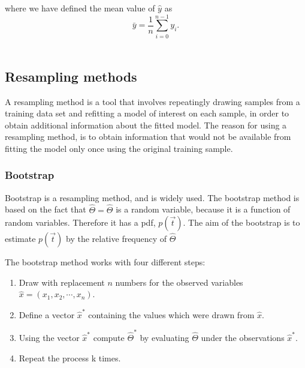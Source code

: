 where we have defined the mean value  of $\hat{y}$ as
\begin{equation}
\bar{y} =  \frac{1}{n} \sum_{i=0}^{n - 1} y_i.
\end{equation}~\cite{Project1}

\subsection{Resampling methods}
A resampling method is a tool that involves 
repeatingly drawing samples from a training data set and refitting a model
of interest on each sample, in order to obtain additional information 
about the fitted model. 
The reason for using a resampling method, is to obtain information that would
not be available from fitting the model only once using the original training
sample. ~\cite{LectureNotes-FysStk}

\subsubsection{Bootstrap}\label{sec:bootstrap}
Bootstrap is a resampling method, and is widely used.
The bootstrap method is based on the fact that \(\hat{\Theta} = \hat{\Theta}\)
is a random variable, because it is a function of random variables. 
Therefore it has a pdf, \(p(\vec{t})\). The aim of the bootstrap is to 
estimate \(p(\vec{t})\) by the relative frequency of \(\hat{\Theta}\)
~\cite{LectureNotes-FysStk}

The bootstrap method works with four different steps: 
\begin{enumerate}
		\item Draw with replacement \(n\) numbers for the observed variables
			\(\hat{x} = (x_1, x_2,\cdots, x_n)\).
		\item Define a vector \(\hat{x}^*\) containing the values which were 
			drawn from \(\hat{x}\). 
		\item Using the vector \(\hat{x}^*\) compute \(\hat{\Theta}^*\)
			by evaluating \(\hat{\Theta}\) under the observations 
			\(\hat{x}^*\).
		\item Repeat the process k times. 
\end{enumerate} 
~\cite{LectureNotes-FysStk}

		







